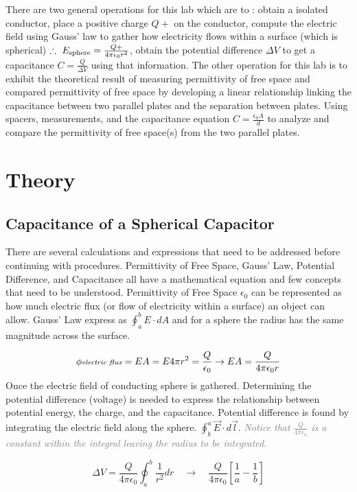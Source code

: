 \documentclass{article}
\begin{document}
There are two general operations for this lab which are to : obtain a isolated conductor, place a positive charge $Q+$ on the conductor, compute the electric field using Gauss' law to gather how electricity flows within a surface {(which is spherical)} $ \therefore \ E_{\text{\scriptsize{sphere}}} = \frac{Q+}{4\pi \epsilon_{0} r^{2} } $, obtain the potential difference $\Delta V$ to get a capacitance $C = \frac{Q}{\Delta V} $ using that information.  The other operation for this lab is to exhibit the theoretical result of measuring permittivity of free space  and compared permittivity of free space by developing a linear relationship linking the capacitance between two parallel plates and the separation between plates. Using spacers, measurements, and the capacitance equation $C = \frac{\epsilon_{0}A}{d}$ to analyze and compare the permittivity of free space(s) from the two parallel plates.
\section*{Theory}
\subsection*{Capacitance of a Spherical Capacitor}
There are several calculations and expressions that need to be addressed before continuing with procedures. Permittivity of Free Space, Gauss' Law, Potential Difference, and Capacitance all have a mathematical equation and few concepts that need to be understood. Permittivity of Free Space $\epsilon_{0}$ can be represented as how much electric flux (or flow of electricity within a surface) an object can allow. Gauss' Law express as $\oint^{b}_{a} E \cdot dA$ and for a sphere the radius has the same magnitude across the surface.
\vfill

$$\phi \textit{\scriptsize{electric flux}} = EA = E4\pi r^{2} = \frac{Q}{\epsilon_{0}} \rightarrow EA = \frac{Q}{4\pi \epsilon_{0} r}$$
Once the electric field of conducting sphere is gathered. Determining the potential difference (voltage) is needed to express the relationship between potential energy, the charge, and the capacitance. Potential difference is found by integrating the electric field along the sphere. $\oint^{a}_{b} \vec{E} \cdot d\vec{l}$. {\small\selectfont \textcolor{gray}{\textit{{Notice that $\frac{Q}{4\pi \epsilon_{0}}$ is a constant within the integral leaving the radius to be integrated.}}}} 
\vfill

$$ \Delta V = \frac{Q}{4\pi\epsilon_{0}} \oint^{b}_{a} \frac{1}{r^{2}} dr \quad \rightarrow \quad  \frac{Q}{4\pi \epsilon_{0}} \left[ \frac{1}{a} - \frac{1}{b} \right] $$
\vfill
\end{document}
